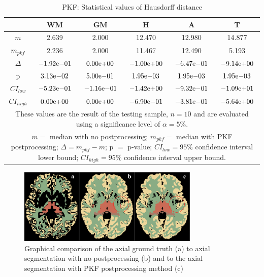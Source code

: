 \documentclass[journal]{IEEEtran}
\begin{document}
\begin{table}[ht]

\renewcommand{\arraystretch}{1.3}
\caption{PKF: Statistical values of Hausdorff distance}
\label{tbl_pkf_hd}
\centering
\tabcolsep=0.06cm
\begin{tabular}{c|c|c|c|c|c}
\hline
 & WM & GM & H & A & T\\
\hline
$m$ &2.639&2.000&12.470&12.980&14.877\\
$m_{pkf}$&2.236&2.000&11.467&12.490&5.193\\
$\Delta$&${-1.92}\mathrm{e}{-01}$&${0.00}\mathrm{e}{+00}$&${-1.00}\mathrm{e}{+00}$&${-6.47}\mathrm{e}{-01}$&${-9.14}\mathrm{e}{+00}$\\
p&${3.13}\mathrm{e}{-02}$&${5.00}\mathrm{e}{-01}$&${1.95}\mathrm{e}{-03}$&${1.95}\mathrm{e}{-03}$&${1.95}\mathrm{e}{-03}$\\
$CI_{low}$&${-5.23}\mathrm{e}{-01}$&${-1.16}\mathrm{e}{-01}$&${-1.42}\mathrm{e}{+00}$&${-9.32}\mathrm{e}{-01}$&${-1.09}\mathrm{e}{+01}$\\
$CI_{high}$&${0.00}\mathrm{e}{+00}$&${0.00}\mathrm{e}{+00}$&${-6.90}\mathrm{e}{-01}$&${-3.81}\mathrm{e}{-01}$&${-5.64}\mathrm{e}{+00}$\\
\hline
\multicolumn{6}{p{3.4in}}{These values are the result of the testing sample, $n=10$ and are evaluated using a significance level of $\alpha = 5\%$. }\\
\multicolumn{6}{p{3.4in}}{$m=$ median with no postprocessing; $m_{pkf}=$ median with PKF postprocessing; $\Delta=m_{pkf}-m$; p $=$ p-value;  $CI_{low}= 95\%$ confidence interval lower bound; $CI_{high}= 95\%$ confidence interval upper bound.}\\

\end{tabular}

\end{table}

\begin{figure}[ht]
\centering
\includegraphics[width=3.4in]{MIALab_Report/img/boxplots/PKF.png}
\caption{Graphical comparison of the axial ground truth (a) to axial segmentation with no postprocessing (b) and to the axial segmentation with PKF postprocessing method (c) }
\label{fig_pkf}
\end{figure}
\end{document}
